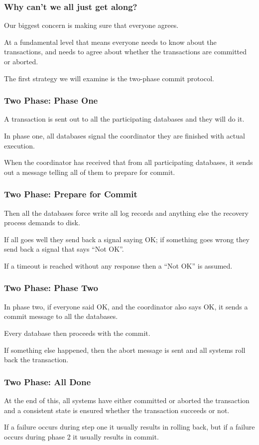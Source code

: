 \begin{frame}
\frametitle{Why can't we all just get along?}

Our biggest concern is making sure that everyone agrees. 

At a fundamental level that means everyone needs to know about the transactions, and needs to agree about whether the transactions are committed or aborted. 

The first strategy we will examine is the two-phase commit protocol.

\end{frame}

\begin{frame}
\frametitle{Two Phase: Phase One}

A transaction is sent out to all the participating databases and they will do it.

In phase one, all databases signal the coordinator they are finished with actual execution.

When the coordinator has received that from all participating databases, it sends out a message telling all of them to prepare for commit.


\end{frame}

\begin{frame}
\frametitle{Two Phase: Prepare for Commit}

Then all the databases force write all log records and anything else the recovery process demands to disk. 

If all goes well they send back a signal saying OK; if something goes wrong they send back a signal that says ``Not OK''. 

If a timeout is reached without any response then a ``Not OK'' is assumed.

\end{frame}

\begin{frame}
\frametitle{Two Phase: Phase Two}

In phase two, if everyone said OK, and the coordinator also says OK, it sends a commit message to all the databases. 

Every database then proceeds with the commit. 

If something else happened, then the abort message is sent and all systems roll back the transaction. 

\end{frame}


\begin{frame}
\frametitle{Two Phase: All Done}

At the end of this, all systems have either committed or aborted the transaction and a consistent state is ensured whether the transaction succeeds or not. 

If a failure occurs during step one it usually results in rolling back, but if a failure occurs during phase 2 it usually results in commit.

\end{frame}

